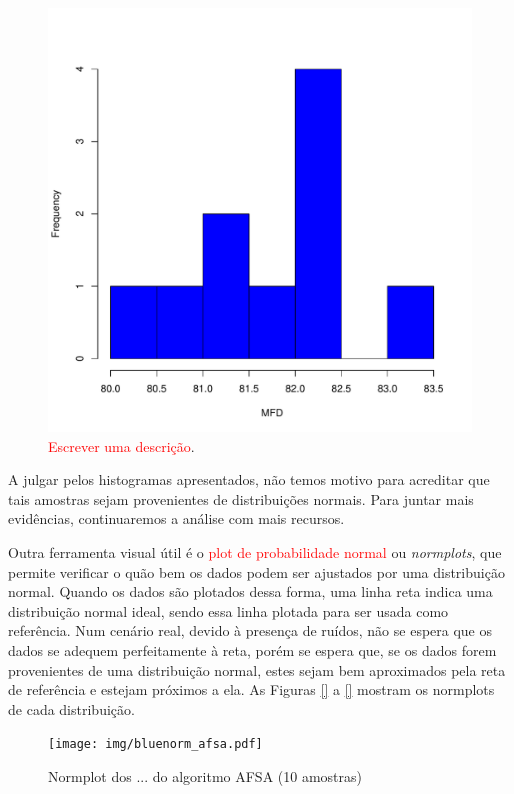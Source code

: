 \documentclass[conference]{IEEEtran}
\begin{document}
\begin{figure}[h]
	\centering
	\includegraphics[width=\linewidth]{img/bluehist_mfd.pdf}
	\caption{\textcolor{red}{Escrever uma descrição}.}
	\label{fig:hist_mfd}
\end{figure}

A julgar pelos histogramas apresentados, não temos motivo para acreditar que tais amostras sejam provenientes de distribuições normais.
Para juntar mais evidências, continuaremos a análise com mais recursos.

Outra ferramenta visual útil é o \textcolor{red}{plot de probabilidade normal} ou \textit{normplots}, que permite verificar o quão bem os dados podem ser ajustados por uma distribuição normal.
Quando os dados são plotados dessa forma, uma linha reta indica uma distribuição normal ideal, sendo essa linha plotada para ser usada como referência.
Num cenário real, devido à presença de ruídos, não se espera que os dados se adequem perfeitamente à reta, porém se espera que, se os dados forem provenientes de uma distribuição normal, estes sejam bem aproximados pela reta de referência e estejam próximos a ela.
As Figuras \ref{} a \ref{} mostram os normplots de cada distribuição.

\begin{figure}[h]
	\centering
	\texttt{[image: img/bluenorm\_afsa.pdf]}
	\caption{Normplot dos ... do algoritmo AFSA (10 amostras)}
	\label{fig:hist_afsa}
\end{figure}
\end{document}

